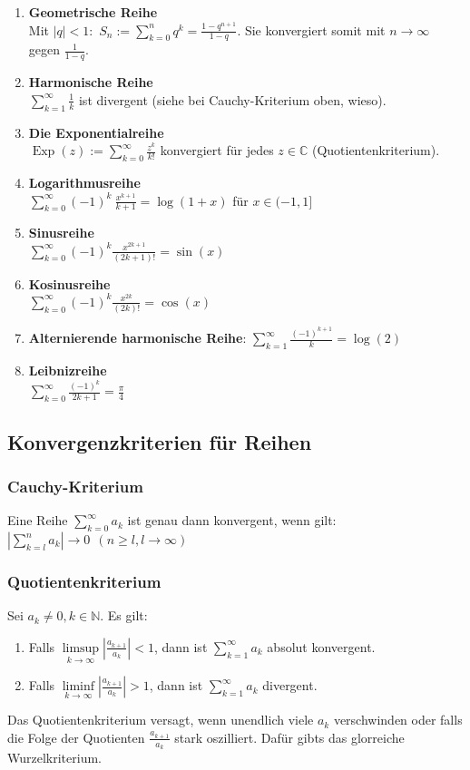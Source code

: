 \documentclass[a4paper,10pt]{scrartcl}
\newcommand{\Exp}{\operatorname{Exp}}
\begin{document}
\begin{multicols}{2}
	\begin{enumerate}[label=$\circ$]
		\item \textbf{Geometrische Reihe}\\ Mit $|q|<1$:\ $S_n:=\sum_{k=0}^{n} q^k = \frac{1-q^{n+1}}{1-q}$. Sie konvergiert somit mit $n\to \infty$ gegen $\frac{1}{1-q}$. 
		\item \textbf{Harmonische Reihe}\\ $\sum_{k=1}^{\infty} \frac{1}{k}$ ist divergent (siehe bei Cauchy-Kriterium oben, wieso).
		\item \textbf{Die Exponentialreihe}\\ $\Exp(z):=\sum_{k=0}^{\infty} \frac{z^k}{k!}$ konvergiert für jedes $z\in\mathbb{C}$ (Quotientenkriterium).
		\columnbreak
		\item \textbf{Logarithmusreihe}\\ $\sum_{k=0}^{\infty} (-1)^k \ \frac{x^{k+1}}{k+1} = \log(1+x)$ für $x\in(-1,1]$
		\item \textbf{Sinusreihe}\\ $\sum_{k=0}^{\infty} (-1)^k \frac{x^{2k+1}}{(2k+1)!} = \sin(x)$
		\item \textbf{Kosinusreihe}\\ $\sum_{k=0}^{\infty} (-1)^k \frac{x^{2k}}{(2k)!} = \cos(x)$
		\item \textbf{Alternierende harmonische Reihe}: $\sum_{k=1}^{\infty} \frac{(-1)^{k+1}}{k} = \log(2)$
		\item \textbf{Leibnizreihe}\\ 
		$\sum_{k=0}^{\infty} \frac{(-1)^k}{2k+1} = \frac{\pi}{4}$
	\end{enumerate}
\end{multicols}
\subsection{Konvergenzkriterien für Reihen}
\subsubsection{Cauchy-Kriterium}
Eine Reihe $\sum_{k=0}^{\infty} a_k$ ist genau dann konvergent, wenn gilt: $\displaystyle \left| \sum_{k=l}^{n} a_k \right| \to 0 \ \ (n\geq l, l\to \infty)$
\subsubsection{Quotientenkriterium}
Sei $a_k\neq 0, k\in \mathbb{N}$. Es gilt: 
\begin{enumerate}[label=$\circ$]
	\item Falls $\displaystyle \limsup\limits_{k\to\infty}\left| \frac{a_{k+1}}{a_k} \right| <1$, dann ist $\sum_{k=1}^{\infty} a_k$ absolut konvergent.
	\item Falls $\displaystyle \liminf\limits_{k\to\infty}\left| \frac{a_{k+1}}{a_k} \right| >1$, dann ist $\sum_{k=1}^{\infty} a_k$ divergent.
\end{enumerate}
Das Quotientenkriterium versagt, wenn unendlich viele $a_k$ verschwinden oder falls die Folge der Quotienten $\frac{a_{k+1}}{a_k}$ stark oszilliert. Dafür gibts das glorreiche Wurzelkriterium.
\end{document}

